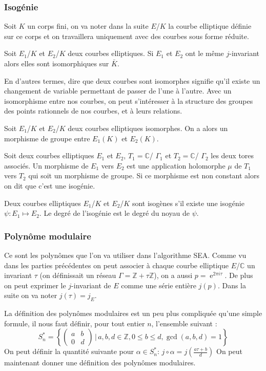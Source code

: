 \documentclass[12pt]{article}
\DeclareMathOperator{\e}{e}
\begin{document}
\subsubsection{Isogénie}
Soit $K$ un corps fini, on va noter dans la suite $E$/$K$ la courbe elliptique définie sur ce corps et on travaillera uniquement avec des courbes sous forme réduite.

\begin{defi}
Soit $E_1$/$K$ et $E_2$/$K$ deux courbes elliptiques. Si $E_1$ et $E_2$ ont le même $j$-invariant alors elles sont isomorphiques sur $\bar{K}$. 
\end{defi}
En d'autres termes, dire que deux courbes sont isomorphes signifie qu'il existe un changement de variable permettant de passer de l'une à l'autre. Avec un isomorphisme entre nos courbes, on peut s'intéresser à la structure des groupes des points rationnels de nos courbes, et à leurs relations.

\begin{prop}
Soit $E_1$/$K$ et $E_2$/$K$ deux courbes elliptiques isomorphes. On a alors un morphisme de groupe entre $E_1(K)$ et $E_2(K)$.
\end{prop}

\begin{defi}
Soit deux courbes elliptiques $E_1$ et $E_2$, $T_1=\mathbb{C}$/ $\Gamma_1$ et $T_2 = \mathbb{C}$/ $\Gamma_2$ les deux tores associés. Un morphisme de $E_1$ vers $E_2$ est une application holomorphe $\mu$ de $T_1$ vers $T_2$ qui soit un morphisme de groupe. Si ce morphisme est non constant alors on dit que c'est une isogénie.
\end{defi}

Deux courbes elliptiques $E_1$/$K$ et $E_2$/$K$ sont isogènes s'il existe une isogénie $\psi : E_1 \mapsto E_2$. Le degré de l’isogénie est le degré du noyau de $\psi$.


\subsubsection{Polynôme modulaire}
Ce sont les polynômes que l'on va utiliser dans l'algorithme SEA. Comme vu dans les parties précédentes on peut associer à chaque courbe elliptique $E$/$\mathbb{C}$ un invariant $\tau$ (on définissait un réseau $\Gamma = \mathbb{Z}+\tau \mathbb{Z}$), on a aussi $p=\e^{2\pi i \tau}$. De plus on peut exprimer le $j$-invariant de $E$ comme une série entière $j(p)$. Dans la suite on va noter $j(\tau) = j_E$.

La définition des polynômes modulaires est un peu plus compliquée qu'une simple formule, il nous faut définir, pour tout entier $n$, l'ensemble suivant : 
\begin{equation*}
S_n^* = \left\{ \begin{pmatrix}
a & b\\
0 & d
\end{pmatrix}
\, | \, a,b,d \in \mathbb{Z}, 0 \leq b \leq d, \gcd(a,b,d) = 1
 \right\} 
\end{equation*}
On peut définir la quantité suivante pour $\alpha \in S_n^* $:  $j \circ \alpha = j(\frac{a\tau +b}{d})$
On peut maintenant donner une définition des polynômes modulaires.
\end{document}
